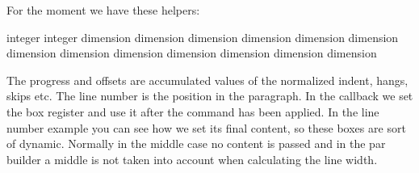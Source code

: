 \typebuffer[example][option=TEX]

{\getbuffer[example]}

\stopsectionlevel

\startsectionlevel[title=The helpers]

For the moment we have these helpers:

\starttabulate[|l|;|]
\NC \type {\localboxclass}            \NC integer   \NC \NR
\NC \type {\localboxlinenumber}       \NC integer   \NC \NR
\NC
\NC \type {\localboxlinewidth}        \NC dimension \NC \NR
\NC \type {\localboxlocalwidth}       \NC dimension \NC \NR
\NC \type {\localboxprogress}         \NC dimension \NC \NR
\NC \type {\localboxleftoffset}       \NC dimension \NC \NR
\NC \type {\localboxrightoffset}      \NC dimension \NC \NR
\NC
\NC \type {\localboxleftskip}         \NC dimension \NC \NR
\NC \type {\localboxrightskip}        \NC dimension \NC \NR
\NC \type {\localboxlefthang}         \NC dimension \NC \NR
\NC \type {\localboxrighthang}        \NC dimension \NC \NR
\NC
\NC \type {\localboxindent}           \NC dimension \NC \NR
\NC \type {\localboxparfillleftskip}  \NC dimension \NC \NR
\NC \type {\localboxparfillrightskip} \NC dimension \NC \NR
\NC \type {\localboxovershoot}        \NC dimension \NC \NR
\NC
\stoptabulate

The progress and offsets are accumulated values of the normalized indent, hangs,
skips etc. The line number is the position in the paragraph. In the callback we
set the box register \type {\localboxcontentbox} and use it after the command has
been applied. In the line number example you can see how we set its final
content, so these boxes are sort of dynamic. Normally in the middle case no
content is passed and in the par builder a middle is not taken into account when
calculating the line width.

\stopsectionlevel

\stopdocument



